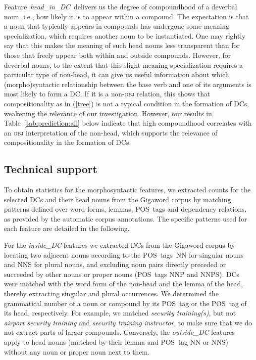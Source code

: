 \documentclass[output=paper]{langsci/langscibook}
\begin{document}
Feature~\textit{head\_in\_DC}~delivers us the degree of compoundhood of a deverbal noun, i.e., how likely it is to appear within a compound.
The expectation is that a noun that typically appears in compounds has undergone some meaning specialization, which requires another noun to be instantiated. One may rightly say that this makes the meaning of such head nouns less transparent than for those that freely appear both within and outside compounds. However, for deverbal nouns, to the extent that this slight meaning specialization requires a particular type of non-head, it can give us useful information about which (morpho)syntactic relationship between the base verb and one of its arguments is most likely to form a DC. If it is a non-\textsc{obj} relation, this shows that compositionality as in (\ref{tree}) is not a typical condition in the formation of DCs, weakening the relevance of our investigation. However, our results in Table~\ref{tab:prediction:all} below indicate that high compoundhood correlates with an \textsc{obj} interpretation of the non-head, which supports the relevance of compositionality in the formation of DCs.


\subsection{Technical support}\label{sec:technical:features}

To obtain statistics for the morphosyntactic features, we extracted counts for the selected DCs and their head nouns from the Gigaword corpus by matching patterns defined over word forms, lemmas, POS~tags and dependency relations, as provided by the automatic corpus annotations.
The specific patterns used for each feature are detailed in the following.

For the \textit{inside\_DC} features we extracted DCs from the Gigaword corpus by locating two adjacent nouns according to the POS~tags~NN for singular nouns and NNS for plural nouns, and  {excluding noun pairs directly preceded or succeeded by other} nouns or proper nouns (POS~tags NNP and NNPS). DCs were matched with the word form of the non-head and the lemma of the head, thereby extracting singular and plural occurrences.
We determined the grammatical number of a noun or compound by its POS~tag or the POS~tag of its head, respectively.
For example, we matched \emph{security training(s)}, but not \emph{airport security training} and \emph{security training instructor}, to make sure that we do not extract parts of larger compounds. Conversely,  the \textit{outside\_DC} features apply to head nouns (matched by their lemma and POS~tag NN or NNS) without any noun or proper noun next to them.
\end{document}
